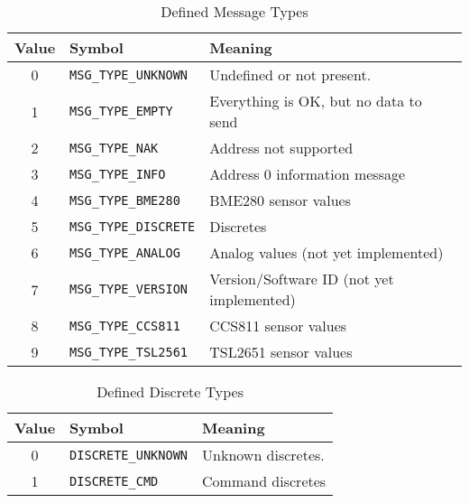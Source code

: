 \documentclass[10pt, openany, draft]{article}
\begin{document}
\begin{table}
  \centering
  \begin{tabular}{c l l}
    \hline
    Value & Symbol & Meaning \\
    \hline
    0 & \texttt{MSG\_TYPE\_UNKNOWN} & Undefined or not present.\\
    1 & \texttt{MSG\_TYPE\_EMPTY} & Everything is OK, but no data to send \\
    2 & \texttt{MSG\_TYPE\_NAK} & Address not supported \\
    3 & \texttt{MSG\_TYPE\_INFO} & Address 0 information message \\
    4 & \texttt{MSG\_TYPE\_BME280} & BME280 sensor values \\
    5 & \texttt{MSG\_TYPE\_DISCRETE} & Discretes \\
    6 & \texttt{MSG\_TYPE\_ANALOG} & Analog values (not yet implemented) \\
    7 & \texttt{MSG\_TYPE\_VERSION} & Version/Software ID (not yet implemented) \\
    8 & \texttt{MSG\_TYPE\_CCS811} & CCS811 sensor values \\
    9 & \texttt{MSG\_TYPE\_TSL2561} & TSL2651 sensor values \\
  \end{tabular}
  \caption{Defined Message Types}
  \label{tab:messagetype}
\end{table}

\begin{table}
  \centering
  \begin{tabular}{c l l}
    \hline
    Value & Symbol & Meaning \\
    \hline
    0 & \texttt{DISCRETE\_UNKNOWN} & Unknown discretes.\\
    1 & \texttt{DISCRETE\_CMD} & Command discretes \\
  \end{tabular}
  \caption{Defined Discrete Types}
  \label{tab:disctype}
\end{table}
\end{document}
